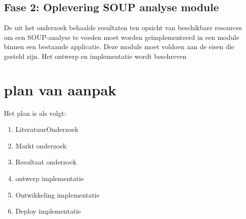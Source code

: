 \subsection{Fase 2: Oplevering SOUP analyse module}\label{subsec:fase-2:-oplevering-soup-analyse-module}
De uit het onderzoek behaalde resultaten ten opzicht van beschikbare resources om een SOUP-analyse te voeden moet worden geïmplementeerd in een module binnen een bestaande applicatie.
Deze module moet voldoen aan de eisen die gesteld zijn.
Het ontwerp en implementatie wordt beschreven

\section{plan van aanpak}\label{sec:plan-van-aanpak}
Het plan is als volgt:
\begin{enumerate}
	\item LiteratuurOnderzoek
	\item Markt onderzoek
	\item Resultaat onderzoek
	\item ontwerp implementatie
	\item Ontwikkeling implementatie
	\item Deploy implementatie
\end{enumerate}

